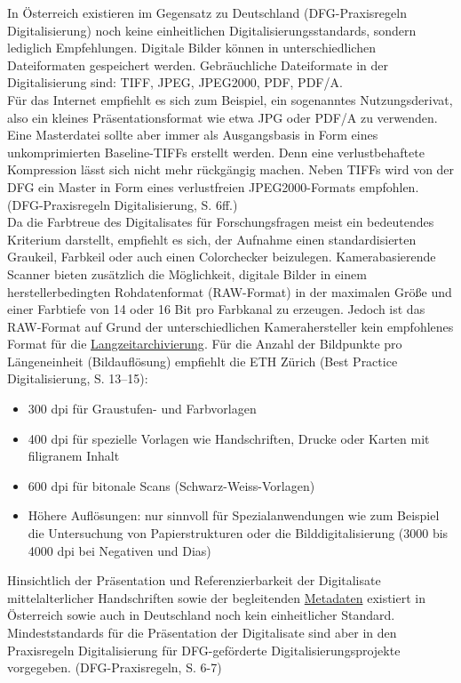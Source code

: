 \documentclass{article}
\begin{document}
    In Österreich existieren im Gegensatz zu Deutschland (DFG-Praxisregeln Digitalisierung) noch keine einheitlichen Digitalisierungsstandards, sondern lediglich Empfehlungen. Digitale Bilder können in unterschiedlichen Dateiformaten gespeichert werden. Gebräuchliche Dateiformate in der Digitalisierung sind: TIFF, JPEG, JPEG2000, PDF, PDF/A. \\
            
        Für das Internet empfiehlt es sich zum Beispiel, ein sogenanntes Nutzungsderivat, also ein kleines Präsentationsformat wie etwa JPG oder PDF/A zu verwenden. Eine Masterdatei sollte aber immer als Ausgangsbasis in Form eines unkomprimierten Baseline-TIFFs erstellt werden. Denn eine verlustbehaftete Kompression lässt sich nicht mehr rückgängig machen. Neben TIFFs wird von der DFG ein Master in Form eines verlustfreien JPEG2000-Formats empfohlen. (DFG-Praxisregeln Digitalisierung, S. 6ff.)\\
            
        Da die Farbtreue des Digitalisates für Forschungsfragen meist ein bedeutendes Kriterium darstellt, empfiehlt es sich, der Aufnahme einen standardisierten Graukeil, Farbkeil oder auch einen Colorchecker beizulegen. Kamerabasierende Scanner bieten zusätzlich die Möglichkeit, digitale Bilder in einem herstellerbedingten Rohdatenformat (RAW-Format) in der maximalen Größe und einer Farbtiefe von 14 oder 16 Bit pro Farbkanal zu erzeugen. Jedoch ist das RAW-Format auf Grund der unterschiedlichen Kamerahersteller kein empfohlenes Format für die  \href{http://gams.uni-graz.at/o:konde.6}{Langzeitarchivierung}. Für die Anzahl der Bildpunkte pro Längeneinheit (Bildauflösung) empfiehlt die ETH Zürich (Best Practice Digitalisierung, S. 13–15):\\
            
        \begin{itemize}\item {300 dpi für Graustufen- und Farbvorlagen}\item {400 dpi für spezielle Vorlagen wie Handschriften, Drucke oder Karten mit filigranem Inhalt}\item {600 dpi für bitonale Scans (Schwarz-Weiss-Vorlagen)}\item {Höhere Auflösungen: nur sinnvoll für Spezialanwendungen wie zum Beispiel die Untersuchung von Papierstrukturen oder die Bilddigitalisierung (3000 bis 4000 dpi bei Negativen und Dias)}\end{itemize}Hinsichtlich der Präsentation und Referenzierbarkeit der Digitalisate mittelalterlicher Handschriften sowie der begleitenden \href{http://gams.uni-graz.at/o:konde.25}{Metadaten} existiert in Österreich sowie auch in Deutschland noch kein einheitlicher Standard. Mindeststandards für die Präsentation der Digitalisate sind aber in den Praxisregeln Digitalisierung für DFG-geförderte Digitalisierungsprojekte vorgegeben. (DFG-Praxisregeln, S.  6-7)\\
            
\end{document}
